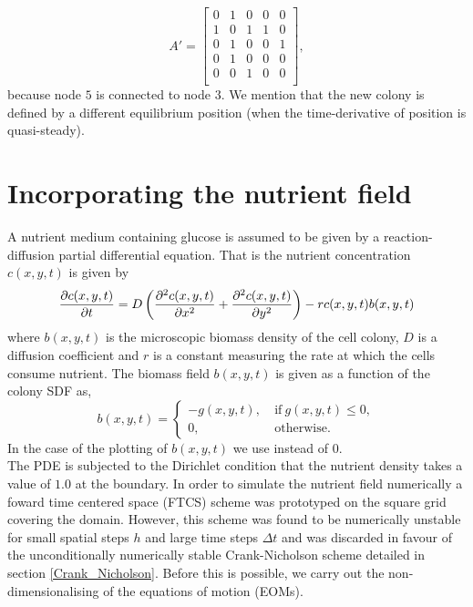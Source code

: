 \begin{equation*}
    A' = 
    \begin{bmatrix}
    0 & 1 & 0 & 0 & 0  \\
    1 & 0 & 1 & 1 & 0  \\
    0 & 1 & 0 & 0 & 1  \\
    0 & 1 & 0 & 0 & 0  \\
    0 & 0 & 1 & 0 & 0  \\ 
    \end{bmatrix},
\end{equation*}
because node $5$ is connected to node $3$. We mention that the new colony 
is defined by a different equilibrium position (when the time-derivative of 
position is quasi-steady).



\section{Incorporating the nutrient field} \label{sec:nutrientField}
A nutrient medium containing glucose is assumed to be given by a reaction-diffusion 
partial differential equation. That is the nutrient concentration $c(x,y,t)$ is given by
\begin{equation*}
    \pdv{c(x,y,t)}{t} = D \left( \frac{\partial^2 c(x,y,t)}{\partial x^2} + 
                          \frac{\partial^2 c(x,y,t)}{\partial y^2} \right) - r c(x,y,t) b(x,y,t)
\end{equation*}
where $b(x,y,t)$ is the microscopic biomass density of the cell colony, $D$ is a diffusion
coefficient and $r$ is a constant measuring the rate at which the cells consume nutrient.
The biomass field $b(x,y,t)$ is given as a function of the colony SDF as,
\begin{equation*}
    b(x,y,t) = \begin{cases}
                -g(x,y,t), & \ \textrm{if} \ g(x,y,t) \leq 0, \\
                0,         & \ \textrm{otherwise}.
               \end{cases}
\end{equation*}
In the case of the plotting of $b(x,y,t)$ we use  instead of $0$. 
\\

The PDE is subjected to the Dirichlet condition
that the nutrient density takes a value of $1.0$ at the boundary. In order to simulate the nutrient field
numerically a foward time centered space (FTCS) scheme was prototyped on the square grid 
covering the domain. However, this scheme was found to be numerically unstable
for small spatial steps $h$ and large time steps $\Delta t$ and was discarded
in favour of the unconditionally numerically stable Crank-Nicholson scheme detailed
in section \ref{Crank_Nicholson}. Before this is possible, 
we carry out the non-dimensionalising of the equations of motion (EOMs).


